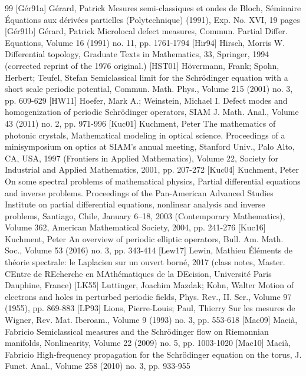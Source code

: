 \begin{thebibliography}{99}
 [Gér91a] Gérard, Patrick Mesures semi-classiques et ondes de Bloch, Séminaire Équations aux dérivées partielles (Polytechnique) (1991), Exp. No. XVI, 19 pages
 [Gér91b] Gérard, Patrick Microlocal defect measures, Commun. Partial Differ. Equations, Volume 16 (1991) no. 11, pp. 1761-1794
 [Hir94] Hirsch, Morris W. Differential topology, Graduate Texts in Mathematics, 33, Springer, 1994 (corrected reprint of the 1976 original.)
 [HST01] Hövermann, Frank; Spohn, Herbert; Teufel, Stefan Semiclassical limit for the Schrödinger equation with a short scale periodic potential, Commun. Math. Phys., Volume 215 (2001) no. 3, pp. 609-629
 [HW11] Hoefer, Mark A.; Weinstein, Michael I. Defect modes and homogenization of periodic Schrödinger operators, SIAM J. Math. Anal., Volume 43 (2011) no. 2, pp. 971-996
 [Kuc01] Kuchment, Peter The mathematics of photonic crystals, Mathematical modeling in optical science. Proceedings of a minisymposium on optics at SIAM’s annual meeting, Stanford Univ., Palo Alto, CA, USA, 1997 (Frontiers in Applied Mathematics), Volume 22, Society for Industrial and Applied Mathematics, 2001, pp. 207-272
 [Kuc04] Kuchment, Peter On some spectral problems of mathematical physics, Partial differential equations and inverse problems. Proceedings of the Pan-American Advanced Studies Institute on partial differential equations, nonlinear analysis and inverse problems, Santiago, Chile, January 6–18, 2003 (Contemporary Mathematics), Volume 362, American Mathematical Society, 2004, pp. 241-276
 [Kuc16] Kuchment, Peter An overview of periodic elliptic operators, Bull. Am. Math. Soc., Volume 53 (2016) no. 3, pp. 343-414
 [Lew17] Lewin, Mathieu Éléments de théorie spectrale: le Laplacien sur un ouvert borné, 2017 (class notes, Master. CEntre de REcherche en MAthématiques de la DEcision, Université Paris Dauphine, France)
 [LK55] Luttinger, Joachim Mazdak; Kohn, Walter Motion of electrons and holes in perturbed periodic fields, Phys. Rev., II. Ser., Volume 97 (1955), pp. 869-883
 [LP93] Lions, Pierre-Louis; Paul, Thierry Sur les mesures de Wigner, Rev. Mat. Iberoam., Volume 9 (1993) no. 3, pp. 553-618
 [Mac09] Macià, Fabricio Semiclassical measures and the Schrödinger flow on Riemannian manifolds, Nonlinearity, Volume 22 (2009) no. 5, pp. 1003-1020
 [Mac10] Macià, Fabricio High-frequency propagation for the Schrödinger equation on the torus, J. Funct. Anal., Volume 258 (2010) no. 3, pp. 933-955

\end{thebibliography}
